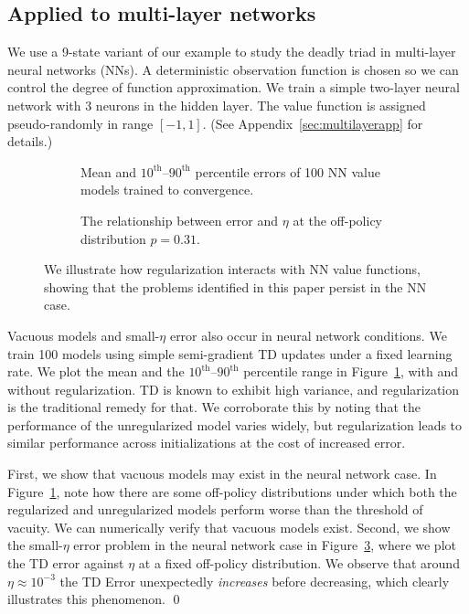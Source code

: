 \subsection{Applied to multi-layer networks}
\label{sec:multilayer}

We use a 9-state variant of our example to study the deadly triad in multi-layer neural networks (NNs). A deterministic observation function is chosen so we can control the degree of function approximation. We train a simple two-layer neural network with 3 neurons in the hidden layer. The value function is assigned pseudo-randomly in range $[-1, 1]$. (See Appendix~\ref{sec:multilayerapp} for details.)

\begin{figure}
  \begin{subfigure}[t]{0.48\textwidth}
    \centering
    
    \caption{Mean and $10^\text{th}$--$90^\text{th}$ percentile errors of 100 NN value models trained to convergence. }
    \label{fig:mlperfdist}
  \end{subfigure}
  \hfill
  \begin{subfigure}[t]{0.48\textwidth}
    \centering
    
    \caption{The relationship between error and $\eta$ at the off-policy distribution $p=0.31$. }
    \label{fig:mlperfeta}
  \end{subfigure}
  \caption{We illustrate how regularization interacts with NN value functions, showing that the problems identified in this paper persist in the NN case. }
\end{figure}

\begin{example}
  Vacuous models and small-$\eta$ error also occur in neural network conditions.
  \label{ex:neuralnetwork}
  \vspace{-1.25em}\proof
  We train 100 models using simple semi-gradient TD updates under a fixed learning rate. We plot the mean and the $10^\text{th}$--$90^\text{th}$ percentile range in Figure~\ref{fig:mlperfdist}, with and without regularization.
  TD is known to exhibit high variance, and regularization is the traditional remedy for that. We corroborate this by noting that the performance of the unregularized model varies widely, but regularization leads to similar performance across initializations at the cost of increased error.

  First, we show that vacuous models may exist in the neural network case. In Figure~\ref{fig:mlperfdist}, note how there are some off-policy distributions under which both the regularized and unregularized models perform worse than the threshold of vacuity. We can numerically verify that vacuous models exist. Second, we show the small-$\eta$ error problem in the neural network case in Figure~\ref*{fig:mlperfeta}, where we plot the TD error against $\eta$ at a fixed off-policy distribution. We observe that around $\eta\approx 10^{-3}$ the TD Error unexpectedly \emph{increases} before decreasing, which clearly illustrates this phenomenon.  \qed
\end{example}

